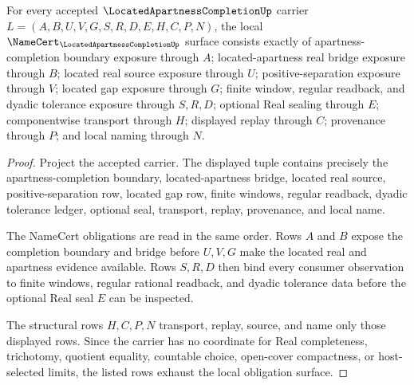 \begin{theorem}
\label{thm:located-apartness-completion-namecert-obligations}
For every accepted $\LocatedApartnessCompletionUp$ carrier $L=(A,B,U,V,G,S,R,D,E,H,C,P,N)$, the local $\NameCert_{\LocatedApartnessCompletionUp}$ surface consists exactly of apartness-completion boundary exposure through $A$; located-apartness real bridge exposure through $B$; located real source exposure through $U$; positive-separation exposure through $V$; located gap exposure through $G$; finite window, regular readback, and dyadic tolerance exposure through $S,R,D$; optional Real sealing through $E$; componentwise transport through $H$; displayed replay through $C$; provenance through $P$; and local naming through $N$.
\end{theorem}
\begin{proof}
Project the accepted carrier. The displayed tuple contains precisely the apartness-completion boundary, located-apartness bridge, located real source, positive-separation row, located gap row, finite windows, regular readback, dyadic tolerance ledger, optional seal, transport, replay, provenance, and local name.

The NameCert obligations are read in the same order. Rows $A$ and $B$ expose the completion boundary and bridge before $U,V,G$ make the located real and apartness evidence available. Rows $S,R,D$ then bind every consumer observation to finite windows, regular rational readback, and dyadic tolerance data before the optional Real seal $E$ can be inspected.

The structural rows $H,C,P,N$ transport, replay, source, and name only those displayed rows. Since the carrier has no coordinate for Real completeness, trichotomy, quotient equality, countable choice, open-cover compactness, or host-selected limits, the listed rows exhaust the local obligation surface.
\end{proof}

